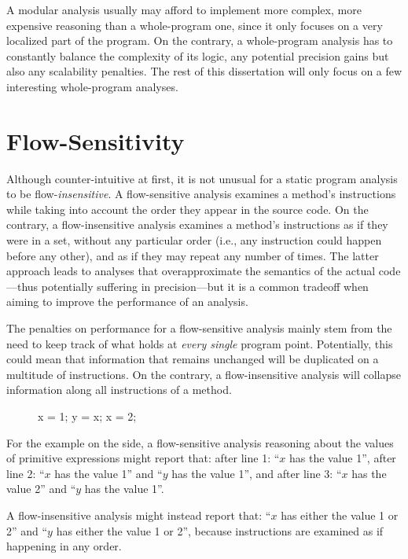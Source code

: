 A modular analysis usually may afford to implement more complex, more expensive reasoning than a whole-program one, since it only focuses on a very localized part of the program. On the contrary, a whole-program analysis has to constantly balance the complexity of its logic,  any potential precision gains but also any scalability penalties. The rest of this dissertation will only focus on a few interesting whole-program analyses.


\section{Flow-Sensitivity}
\label{sec:intro:flowSensitivity}

Although counter-intuitive at first, it is not unusual for a static program analysis to be flow-\emph{insensitive}. A flow-sensitive analysis examines a method's instructions while taking into account the order they appear in the source code. On the contrary, a flow-insensitive analysis examines a method's instructions as if they were in a set, without any particular order (i.e., any instruction could happen before any other), and as if they may repeat any number of times. The latter approach leads to analyses that overapproximate the semantics of the actual code---thus potentially suffering in precision---but it is a common tradeoff when aiming to improve the performance of an analysis.

The penalties on performance for a flow-sensitive analysis mainly stem from the need to keep track of what holds at \emph{every single} program point. Potentially, this could mean that information that remains unchanged will be duplicated on a multitude of instructions. On the contrary, a flow-insensitive analysis will collapse information along all instructions of a method.

{
\setlength\intextsep{-10pt}
\begin{figure}
\centering
\begin{javacode}
x = 1;
y = x;
x = 2;
\end{javacode}
\end{figure}

For the example on the side, a flow-sensitive analysis reasoning about the values of primitive expressions might report that:
after line 1: ``$x$ has the value 1'',
after line 2: ``$x$ has the value 1'' and ``$y$ has the value 1'', and
after line 3: ``$x$ has the value 2'' and ``$y$ has the value 1''.

A flow-insensitive analysis might instead report that:
``$x$ has either the value 1 or 2'' and ``$y$ has either the value 1 or 2'',
because instructions are examined as if happening in any order.
}


